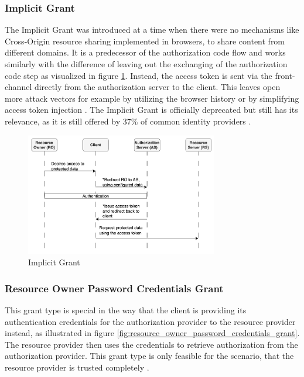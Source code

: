 \subsubsection{Implicit Grant}
The Implicit Grant was introduced at a time when there were no mechanisms like Cross-Origin resource sharing implemented in browsers, to share content from different domains. It is a predecessor of the authorization code flow and works similarly with the difference of leaving out the exchanging of the authorization code step as visualized in figure \ref{fig:implicit_grant}. Instead, the access token is sent via the front-channel directly from the authorization server to the client. This leaves open more attack vectors for example by utilizing the browser history or by simplifying access token injection \cite{lodderstedt2020oauth}. The Implicit Grant is officially deprecated but still has its relevance, as it is still offered by 37\% of common identity providers \cite{philippaerts2022oauch}.

\begin{figure}[ht]
	\sffamily\footnotesize
	\includegraphics[width=0.75\textwidth]{pic/implicit_grant.png}
	\unitlength=0.75mm
	\linethickness{0.4pt}
	\caption{Implicit Grant}
	\label{fig:implicit_grant}
\end{figure}

\subsubsection{Resource Owner Password Credentials Grant}
This grant type is special in the way that the client is providing its authentication credentials for the authorization provider to the resource provider instead, as illustrated in figure \ref{fig:resource_owner_password_credentials_grant}. The resource provider then uses the credentials to retrieve authorization from the authorization provider. This grant type is only feasible for the scenario, that the resource provider is trusted completely \cite{hardt2012rfc}.

